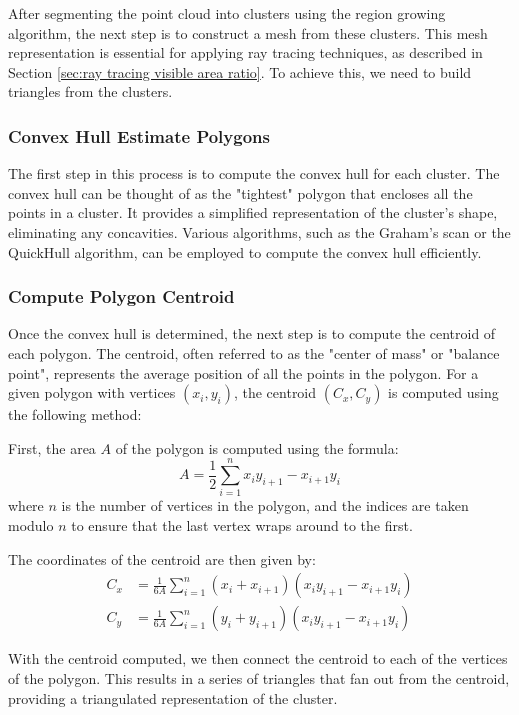 \documentclass[11pt, a4paper,oneside,chapterprefix=false]{scrbook}
\begin{document}
After segmenting the point cloud into clusters using the region growing algorithm, the next step is to construct a mesh from these clusters. This mesh representation is essential for applying ray tracing techniques, as described in Section \ref{sec:ray tracing visible area ratio}. To achieve this, we need to build triangles from the clusters.

\subsubsection{Convex Hull Estimate Polygons}

The first step in this process is to compute the convex hull for each cluster. The convex hull can be thought of as the "tightest" polygon that encloses all the points in a cluster. It provides a simplified representation of the cluster's shape, eliminating any concavities. Various algorithms, such as the Graham's scan or the QuickHull algorithm, can be employed to compute the convex hull efficiently.

\subsubsection{Compute Polygon Centroid}

Once the convex hull is determined, the next step is to compute the centroid of each polygon. The centroid, often referred to as the "center of mass" or "balance point", represents the average position of all the points in the polygon. For a given polygon with vertices \( (x_i, y_i) \), the centroid \( (C_x, C_y) \) is computed using the following method:

First, the area \( A \) of the polygon is computed using the formula:
\[ A = \frac{1}{2} \sum_{i=1}^{n} x_i y_{i+1} - x_{i+1} y_i \]
where \( n \) is the number of vertices in the polygon, and the indices are taken modulo \( n \) to ensure that the last vertex wraps around to the first.

The coordinates of the centroid are then given by:
\begin{align*}
C_x &= \frac{1}{6A} \sum_{i=1}^{n} (x_i + x_{i+1}) (x_i y_{i+1} - x_{i+1} y_i) \\
C_y &= \frac{1}{6A} \sum_{i=1}^{n} (y_i + y_{i+1}) (x_i y_{i+1} - x_{i+1} y_i)
\end{align*}

With the centroid computed, we then connect the centroid to each of the vertices of the polygon. This results in a series of triangles that fan out from the centroid, providing a triangulated representation of the cluster.
\end{document}
